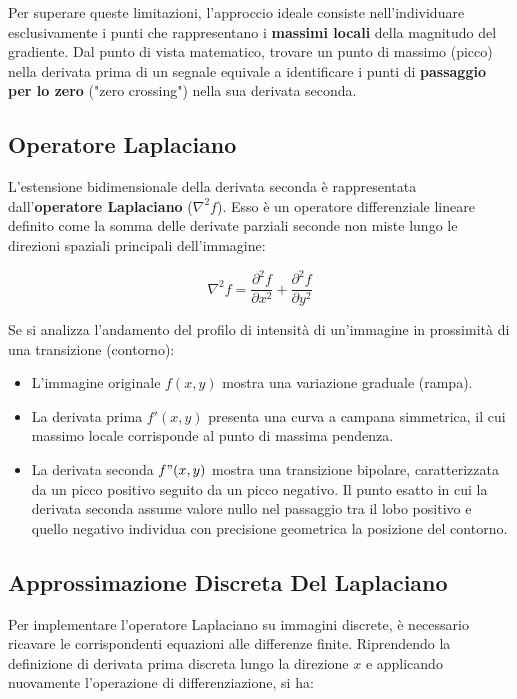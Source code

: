 ﻿\documentclass[11pt, a4paper]{article}
\begin{document}
Per superare queste limitazioni, l'approccio ideale consiste nell'individuare esclusivamente i punti che rappresentano i \textbf{massimi locali} della magnitudo del gradiente. Dal punto di vista matematico, trovare un punto di massimo (picco) nella derivata prima di un segnale equivale a identificare i punti di \textbf{passaggio per lo zero} ("zero crossing") nella sua derivata seconda.

\subsection{Operatore Laplaciano}

L'estensione bidimensionale della derivata seconda è rappresentata dall'\textbf{operatore Laplaciano} ($\nabla^2 f$). Esso è un operatore differenziale lineare definito come la somma delle derivate parziali seconde non miste lungo le direzioni spaziali principali dell'immagine:

\[ \nabla^2 f = \frac{\partial^2 f}{\partial x^2} + \frac{\partial^2 f}{\partial y^2} \]

Se si analizza l'andamento del profilo di intensità di un'immagine in prossimità di una transizione (contorno):
\begin{itemize}
    \item L'immagine originale $f(x,y)$ mostra una variazione graduale (rampa).
    \item La derivata prima $f'(x,y)$ presenta una curva a campana simmetrica, il cui massimo locale corrisponde al punto di massima pendenza.
    \item La derivata seconda $f"(x,y)$ mostra una transizione bipolare, caratterizzata da un picco positivo seguito da un picco negativo. Il punto esatto in cui la derivata seconda assume valore nullo nel passaggio tra il lobo positivo e quello negativo individua con precisione geometrica la posizione del contorno.
\end{itemize}


\subsection{Approssimazione Discreta Del Laplaciano}

Per implementare l'operatore Laplaciano su immagini discrete, è necessario ricavare le corrispondenti equazioni alle differenze finite. Riprendendo la definizione di derivata prima discreta lungo la direzione $x$ e applicando nuovamente l'operazione di differenziazione, si ha:
\end{document}
